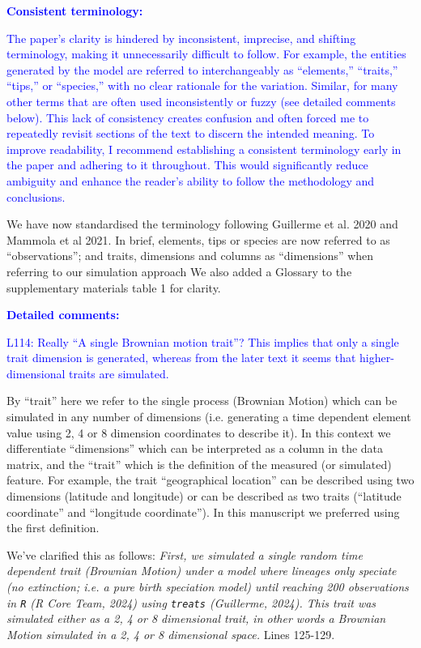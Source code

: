 \documentclass[
]{article}
\begin{document}
\textcolor{blue}{\textbf{Consistent terminology:}}

\textcolor{blue}{The paper's clarity is hindered by inconsistent, imprecise, and shifting terminology, making it unnecessarily difficult to follow.
For example, the entities generated by the model are referred to interchangeably as ``elements,'' ``traits,'' ``tips,'' or ``species,'' with no clear rationale for the variation.
Similar, for many other terms that are often used inconsistently or fuzzy (see detailed comments below).
This lack of consistency creates confusion and often forced me to repeatedly revisit sections of the text to discern the intended meaning.
To improve readability, I recommend establishing a consistent terminology early in the paper and adhering to it throughout.
This would significantly reduce ambiguity and enhance the reader's ability to follow the methodology and conclusions.}

We have now standardised the terminology following Guillerme et al. 2020 and Mammola et al 2021.
In brief, elements, tips or species are now referred to as ``observations''; and traits, dimensions and columns as ``dimensions'' when referring to our simulation approach
We also added a Glossary to the supplementary materials table 1 for clarity.

\textcolor{blue}{\textbf{Detailed comments:}}

\textcolor{blue}{L114: Really ``A single Brownian motion trait''? This implies that only a single trait dimension is generated, whereas from the later text it seems that higher-dimensional traits are simulated.}

By ``trait'' here we refer to the single process (Brownian Motion) which can be simulated in any number of dimensions (i.e. generating a time dependent element value using 2, 4 or 8 dimension coordinates to describe it).
In this context we differentiate ``dimensions'' which can be interpreted as a column in the data matrix, and the ``trait'' which is the definition of the measured (or simulated) feature.
For example, the trait ``geographical location'' can be described using two dimensions (latitude and longitude) or can be described as two traits (``latitude coordinate'' and ``longitude coordinate'').
In this manuscript we preferred using the first definition.

We've clarified this as follows:
\textit{First, we simulated a single random time dependent trait (Brownian Motion) under a model where lineages only speciate (no extinction; i.e. a pure birth speciation model) until reaching 200 observations in \texttt{R} (R Core Team, 2024) using \texttt{treats} (Guillerme, 2024). This trait was simulated either as a 2, 4 or 8 dimensional trait, in other words a Brownian Motion simulated in a 2, 4 or 8 dimensional space.}
Lines 125-129.
\end{document}
